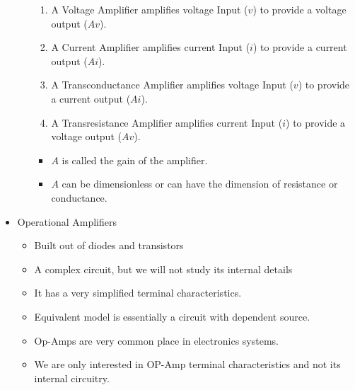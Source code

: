 \begin{itemize}
\begin{itemize}
\begin{enumerate}
          \item A Voltage Amplifier amplifies voltage Input ($v$) to provide a voltage output ($Av$).

          \item A Current Amplifier amplifies current Input ($i$) to provide a current output ($Ai$).

          \item A Transconductance Amplifier amplifies voltage Input ($v$) to provide a current output ($Ai$).

          \item A Transresistance Amplifier amplifies current Input ($i$) to provide a voltage output ($Av$).

        \end{enumerate}

        \begin{itemize}

          \item $A$ is called the gain of the amplifier.

          \item $A$ can be dimensionless or can have the dimension of resistance or conductance.

        \end{itemize}

    \end{itemize}

  \item Operational Amplifiers

    \begin{itemize}

      \item Built out of diodes and transistors

      \item A complex circuit, but we will not study its internal details

      \item It has a very simplified terminal characteristics.

      \item Equivalent model is essentially a circuit with dependent source.

      \item Op-Amps are very common place in electronics systems.

      \item We are only interested in OP-Amp terminal characteristics and not its internal circuitry.


\end{itemize}
\end{itemize}
